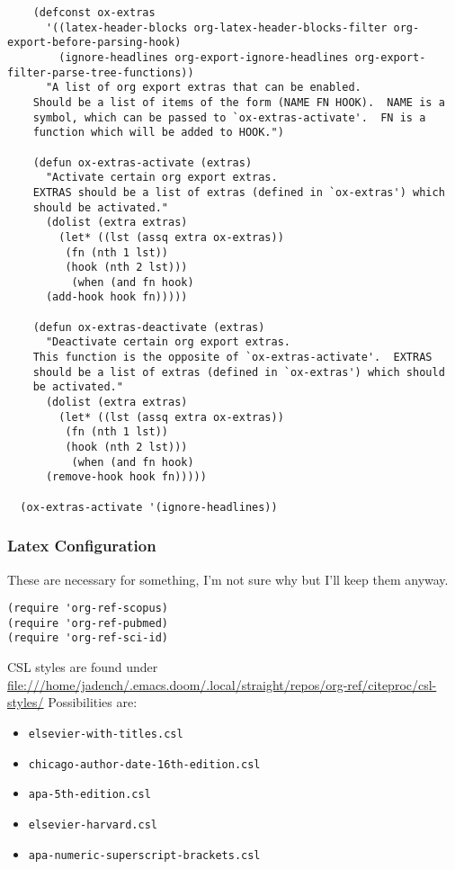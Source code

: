 \documentclass[11pt]{article}
\begin{document}
\begin{verbatim}
    (defconst ox-extras
      '((latex-header-blocks org-latex-header-blocks-filter org-export-before-parsing-hook)
        (ignore-headlines org-export-ignore-headlines org-export-filter-parse-tree-functions))
      "A list of org export extras that can be enabled.
    Should be a list of items of the form (NAME FN HOOK).  NAME is a
    symbol, which can be passed to `ox-extras-activate'.  FN is a
    function which will be added to HOOK.")

    (defun ox-extras-activate (extras)
      "Activate certain org export extras.
    EXTRAS should be a list of extras (defined in `ox-extras') which
    should be activated."
      (dolist (extra extras)
        (let* ((lst (assq extra ox-extras))
         (fn (nth 1 lst))
         (hook (nth 2 lst)))
          (when (and fn hook)
      (add-hook hook fn)))))

    (defun ox-extras-deactivate (extras)
      "Deactivate certain org export extras.
    This function is the opposite of `ox-extras-activate'.  EXTRAS
    should be a list of extras (defined in `ox-extras') which should
    be activated."
      (dolist (extra extras)
        (let* ((lst (assq extra ox-extras))
         (fn (nth 1 lst))
         (hook (nth 2 lst)))
          (when (and fn hook)
      (remove-hook hook fn)))))

  (ox-extras-activate '(ignore-headlines))

\end{verbatim}

\subsubsection{Latex Configuration}
\label{sec:org84acd56}
These are necessary for something, I'm not sure why but I'll keep them anyway.
\begin{verbatim}
(require 'org-ref-scopus)
(require 'org-ref-pubmed)
(require 'org-ref-sci-id)
\end{verbatim}

CSL styles are found under \url{file:///home/jadench/.emacs.doom/.local/straight/repos/org-ref/citeproc/csl-styles/}
Possibilities are: 
\begin{itemize}
\item \texttt{elsevier-with-titles.csl}
\item \texttt{chicago-author-date-16th-edition.csl}
\item \texttt{apa-5th-edition.csl}
\item \texttt{elsevier-harvard.csl}
\item \texttt{apa-numeric-superscript-brackets.csl}
\end{itemize}
\end{document}
